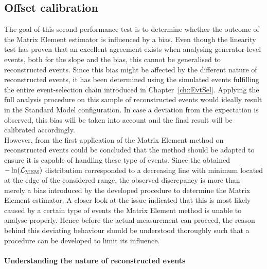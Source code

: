
\subsection{Offset calibration}

The goal of this second performance test is to determine whether the outcome of the Matrix Element estimator is influenced by a bias.
Even though the linearity test has proven that an excellent agreement exists when analysing generator-level events, both for the slope and the bias, this cannot be generalised to reconstructed events.
Since this bias might be affected by the different nature of reconstructed events, it has been determined using the simulated events fulfilling the entire event-selection chain introduced in Chapter~\ref{ch::EvtSel}.
Applying the full analysis procedure on this sample of reconstructed events would ideally result in the Standard Model configuration.
In case a deviation from the expectation is observed, this bias will be taken into account and the final result will be calibrated accordingly. 
\\

However, from the first application of the Matrix Element method on reconstructed events could be concluded that the method should be adapted to ensure it is capable of handling these type of events.
Since the obtained $-\ln(\mathcal{L}_{\textrm{MEM}})$ distribution corresponded to a decreasing line with minimum located at the edge of the considered range, the observed discrepancy is more than merely a bias introduced by the developed procedure to determine the Matrix Element estimator.
A closer look at the issue indicated that this is most likely caused by a certain type of events the Matrix Element method is unable to analyse properly.
Hence before the actual measurement can proceed, the reason behind this deviating behaviour should be understood thoroughly such that a procedure can be developed to limit its influence.

\paragraph{Understanding the nature of reconstructed events} \hfill \\ %

